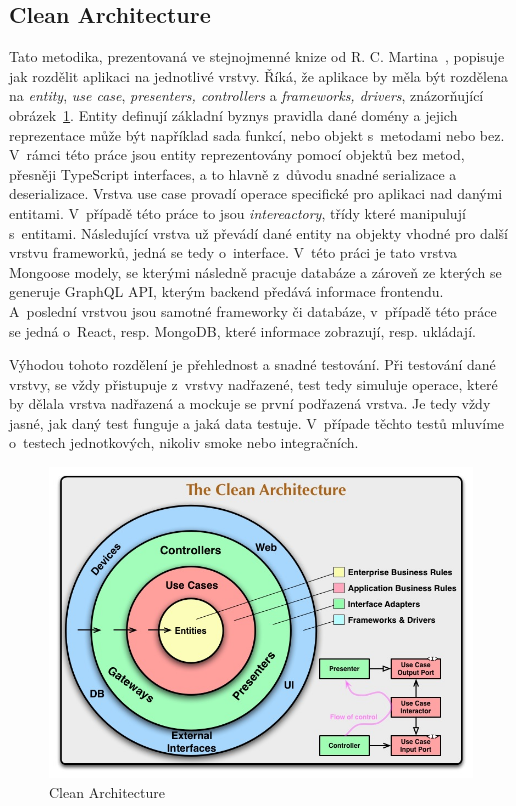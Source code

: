 \subsection{Clean Architecture}
\label{ss:clean_architecture}
Tato metodika, prezentovaná ve stejnojmenné knize od R. C. Martina~\cite{martin_2018_clean}, popisuje jak rozdělit aplikaci na jednotlivé vrstvy. Říká, že aplikace by měla být rozdělena na \emph{entity}, \emph{use case}, \emph{presenters, controllers} a \emph{frameworks, drivers}, znázorňující obrázek~\ref{fig:clean_architecture}.
Entity definují základní byznys pravidla dané domény a jejich reprezentace může být například sada funkcí, nebo objekt s~metodami nebo bez. V~rámci této práce jsou entity reprezentovány pomocí objektů bez metod, přesněji TypeScript interfaces, a to hlavně z~důvodu snadné serializace a deserializace.
Vrstva use case provadí operace specifické pro aplikaci nad danými entitami. V~případě této práce to jsou \emph{intereactory}, třídy které manipulují s~entitami.
Následující vrstva už převádí dané entity na objekty vhodné pro další vrstvu frameworků, jedná se tedy o~interface. V~této práci je tato vrstva Mongoose modely, se kterými následně pracuje databáze a zároveň ze kterých se generuje GraphQL API, kterým backend předává informace frontendu. A~poslední vrstvou jsou samotné frameworky či databáze, v~případě této práce se jedná o~React, resp. MongoDB, které informace zobrazují, resp. ukládají.

Výhodou tohoto rozdělení je přehlednost a snadné testování. Při testování dané vrstvy, se vždy přistupuje z~vrstvy nadřazené, test tedy simuluje operace, které by dělala vrstva nadřazená a mockuje se první podřazená vrstva. Je tedy vždy jasné, jak daný test funguje a jaká data testuje. V~případe těchto testů mluvíme o~testech jednotkových, nikoliv smoke nebo integračních.

\begin{figure}
    \centering
    \includegraphics[width=\textwidth]{assets/clean_architecture.jpg}
    \caption{Clean Architecture~\cite{martin_2019_clean}}
    \label{fig:clean_architecture}
\end{figure}
